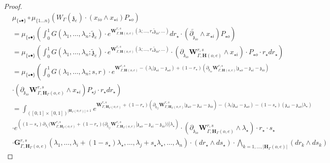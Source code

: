 \documentclass[11pt]{amsart}
\theoremstyle{definition}
\theoremstyle{remark}
\numberwithin{equation}{section}
\begin{document}
\begin{proof}
 \begin{align*}
     &   \mu_{\{\star\bullet\}}\circ \mu_{\{1\dots n\}}\left(W_{\Gamma}(\mathfrak{z}_{e})\cdot (x_{io}\wedge x_{\star i})P_{\star o }\right) \\
     & =\mu_{\{\star\bullet\}}\left(\int^1_0G(\lambda_1,\dots,\lambda_{n};\tilde{\mathfrak{z}}_e)\cdot e^{ \mathbf{W}^{r,s}_{\Gamma,\mathbf{H}(o,e)}(\lambda;\dots,r_{\star}\tilde{\mathfrak{z}}_{io},\dots)}dr_{\star}\cdot (\overleftarrow{\partial_{ \tilde{\mathfrak{z}}_{io}}}\wedge x_{\star i})P_{\star o }\right)\\
     & =\mu_{\{\star\bullet\}}\left(\int^1_0G(\lambda_1,\dots,\lambda_{n};\tilde{\mathfrak{z}}_e)\cdot e^{ \mathbf{W}^{r,s}_{\Gamma,\mathbf{H}(o,e)}(\lambda;\dots,r_{\star}\tilde{\mathfrak{z}}_{io},\dots)}\cdot \left(\partial_{\mathfrak{z}_{io}}\mathbf{W}^{r,s}_{\Gamma,\mathbf{H}(o,e)}    \wedge x_{\star i}\right)\cdot P_{\star o}\cdot r_{\star}dr_{\star}\right)\\
            & =\mu_{\{\star\bullet\}}\left(\int^1_0G(\lambda_1,\dots,\lambda_{n};s,r)\cdot e^{\mathbf{W}^{r,s}_{\Gamma,\mathbf{H}(o,e)}-\left(\lambda_i|\mathfrak{z}_{\star i}-\mathfrak{z}_{\star o}\right)+(1-r_{\star})\left(\partial_{\mathfrak{z}_{io}}\mathbf{W}^{r,s}_{\Gamma,\mathbf{H}(o,e)}|\mathfrak{z}_{\star o}-\mathfrak{z}_{\star i}-\mathfrak{z}_{io}\right)}\right.\\
      &    \left.\cdot \left(\partial_{\mathfrak{z}_{io}}\mathbf{W}^{r,s}_{\Gamma,\mathbf{H}_{\Gamma}(o,e)}\wedge x_{\star i}\right) P_{\star j}\cdot r_{\star}dr_{\star}\right)\\
                     &= \int_{([0,1]\times[0,1])^{|\mathbf{H}_{\Gamma}(o,e)|+1}} e^{\mathbf{W}^{r,s}_{\Gamma,\mathbf{H}_{\Gamma}(o,e)}+(1-r_{\star})\left(\partial_{\mathfrak{z}_{ij}}\mathbf{W}^{r,s}_{\Gamma,\mathbf{H}_{\Gamma}(o,e)}|\mathfrak{z}_{\star o}-\mathfrak{z}_{\star i}-\mathfrak{z}_{io}\right)-\left(\lambda_i|\mathfrak{z}_{\star i}-\mathfrak{z}_{\star o}\right)-(1-s_{\star})\left(\mathfrak{z}_{\star i}-\mathfrak{z}_{\star o}|\lambda_{\star}\right)} \\
   & \cdot e^{\left((1-s_{\star})\partial_{\lambda_i}(\mathbf{W}^{r,s}_{\Gamma,\mathbf{H}_{\Gamma}(o,e)}+(1-r_{\star})(\partial_{\mathfrak{z}_{ij}}\mathbf{W}^{r,s}_{\Gamma,\mathbf{H}_{\Gamma}(o,e)}|\mathfrak{z}_{\star o}-\mathfrak{z}_{\star i}-\mathfrak{z}_{io}))|\lambda_{\star}\right)}\cdot \left(\partial_{\mathfrak{z}_{io}}\mathbf{W}^{r,s}_{\Gamma,\mathbf{H}_{\Gamma}(o,e)}\wedge\lambda_{\star}\right)\cdot r_{\star}\cdot s_{\star}\\
   &\cdot  \mathbf{G}^{r,s}_{\Gamma,\mathbf{H}_{\Gamma}(o,e)}(\lambda_1,\dots,\lambda_i+(1-s_{\star})\lambda_{\star},\dots,\lambda_j+s_{\star}\lambda_{\star},\dots,\lambda_{n})\cdot (dr_{\star}\wedge ds_{\star})\cdot \bigwedge_{k=1,\dots,|\mathbf{H}_{\Gamma}(o,e)|} (dr_k\wedge ds_k)
                          \end{align*}


\end{proof}
\end{document}
